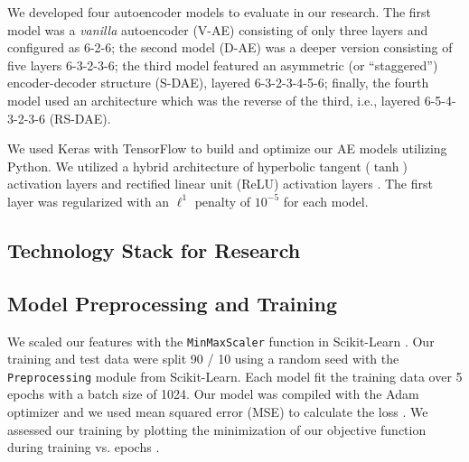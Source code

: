 \documentclass[sigconf]{acmart}
\begin{document}
We developed four autoencoder models to evaluate in our research.  The first model was a \textit{vanilla} autoencoder (V-AE) consisting of only three layers and configured as 6-2-6;  the second model (D-AE) was a deeper version consisting of five layers 6-3-2-3-6;  the third model featured an asymmetric (or ``staggered'') encoder-decoder structure (S-DAE), layered 6-3-2-3-4-5-6;  finally, the fourth model used an architecture which was the reverse of the third, i.e., layered 6-5-4-3-2-3-6
(RS-DAE). 

We used Keras with TensorFlow to build and optimize our AE models utilizing Python.  We utilized a hybrid architecture of hyperbolic tangent ($\tanh$) activation layers and rectified linear unit (ReLU) activation layers \cite{CHOLLET}.  The first layer was regularized with an $\ell^1$ penalty of $10^{-5}$ for each model.  %

\subsection{Technology Stack for Research}

\subsection{Model Preprocessing and Training}
We scaled our features with the \texttt{MinMaxScaler} function in Scikit-Learn \cite{BENGIO,PEDREGOSA,CHOLLET}. Our training and test data were split 90 / 10 using a random seed with the \texttt{Preprocessing} module from Scikit-Learn. Each model fit the training data over 5 epochs with a batch size of 1024. Our model was compiled with the Adam optimizer and we used mean squared error (MSE) to calculate the loss \cite{KINGMA}. We assessed our training by plotting the minimization of our objective function during training vs. epochs \cite{PEDREGOSA,CHOLLET} .
\end{document}
